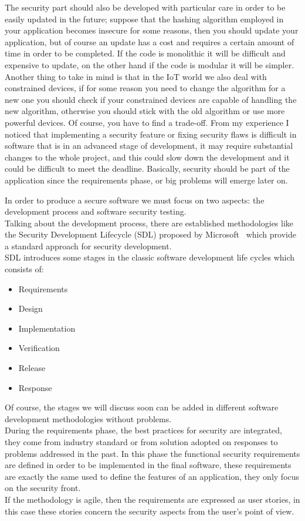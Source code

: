 The security part should also be developed with particular care in order to be easily updated in the future; suppose that the hashing algorithm employed in your application becomes insecure for some reasons, then you should update your application, but of course an update has a cost and requires a certain amount of time in order to be completed. If the code is monolithic it will be difficult and expensive to update, on the other hand if the code is modular it will be simpler.\newline
Another thing to take in mind is that in the IoT world we also deal with constrained devices, if for some reason you need to change the algorithm for a new one you should check if your constrained devices are capable of handling the new algorithm, otherwise you should stick with the old algorithm or use more powerful devices. Of course, you have to find a trade-off.\newline
From my experience I noticed that implementing a security feature or fixing security flaws is difficult in software that is in an advanced stage of development, it may require substantial changes to the whole project, and this could slow down the development and it could be difficult to meet the deadline.\newline
Basically, security should be part of the application since the requirements phase, or big problems will emerge later on.\newline

In order to produce a secure software we must focus on two aspects: the development process and software security testing.\\
Talking about the development process, there are established methodologies like the Security Development Lifecycle (SDL) proposed by Microsoft~\cite{microsoftsdl} which provide a standard approach for security development.\\
SDL introduces some stages in the classic software development life cycles which consists of:
\begin{itemize}
	\item Requirements
	\item Design
	\item Implementation
	\item Verification
	\item Release
	\item Response
\end{itemize}
Of course, the stages we will discuss soon can be added in different software development methodologies without problems.\\
During the requirements phase, the best practices for security are integrated, they come from industry standard or from
solution adopted on responses to problems addressed in the past.
In this phase the functional security requirements are defined in order to be implemented in the final software, 
these requirements are exactly the same used to define the features of an application, they only focus on the security front.\\
If the methodology is agile, then the requirements are expressed as user stories, in this case these stories concern the security aspects from the user's point of view.\\


